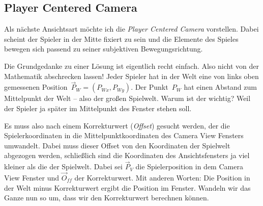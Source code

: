 
\subsection{Player Centered Camera}

Als nächste Ansichtsart möchte ich die \emph{Player Centered Camera} vorstellen. Dabei scheint der Spieler in der Mitte fixiert zu sein und die Elemente des Spieles bewegen sich passend zu seiner subjektiven Bewegungsrichtung. 

Die Grundgedanke zu einer Lösung ist eigentlich recht einfach. Also nicht von der Mathematik abschrecken lassen! Jeder Spieler hat in der Welt eine von links oben gemessenen Position~$\vec{P}_W=(P_{Wx},P_{Wy})$. Der Punkt~$P_W$ hat einen Abstand zum Mittelpunkt der Welt -- also der großen Spielwelt. Warum ist der wichtig? Weil der Spieler ja später im Mittelpunkt des Fenster stehen soll. 

Es muss also nach einem Korrekturwert (\emph{Offset}) gesucht werden, der die Spielerkoordinaten in die Mittelpunktkoordinaten des Camera View Fensters umwandelt. Dabei muss dieser Offset von den Koordinaten der Spielwelt abgezogen werden, schließlich sind die Koordinaten des Ansichtsfensters ja viel kleiner als die der Spielwelt. Dabei sei $\vec{P}_V$ die Spielerposition in dem Camera View Fenster und $\vec{O}_{ff}$ der Korrekturwert. Mit anderen Worten: Die Position in der Welt minus Korrekturwert ergibt die Position im Fenster. Wandeln wir das Ganze nun so um, dass wir den Korrekturwert berechnen können.

